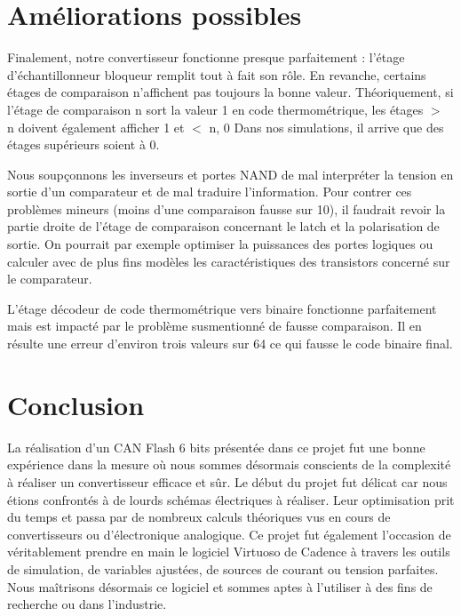 \documentclass[11pt]{article}
\begin{document}
\clearpage

\section{Am\'eliorations possibles}

Finalement, notre convertisseur fonctionne presque parfaitement : l'\'etage d'\'echantillonneur bloqueur remplit tout \`a fait son r\^ole.
En revanche, certains \'etages de comparaison n'affichent pas toujours la bonne valeur. Th\'eoriquement, si l'\'etage de comparaison n sort
la valeur 1 en code thermom\'etrique, les \'etages $>$ n doivent \'egalement afficher 1 et $<$ n, 0 Dans nos simulations, il arrive que des \'etages
sup\'erieurs soient \`a 0.

Nous soup\c connons les inverseurs et portes NAND de mal interpr\'eter la tension en sortie d'un comparateur et de mal traduire l'information.
Pour contrer ces probl\`emes mineurs (moins d'une comparaison fausse sur 10), il faudrait revoir la partie droite de l'\'etage de comparaison
concernant le latch et la polarisation de sortie. On pourrait par exemple optimiser la puissances des portes logiques ou calculer avec de
plus fins mod\`eles les caract\'eristiques des transistors concern\'e sur le comparateur.

L'\'etage d\'ecodeur de code thermom\'etrique vers binaire fonctionne parfaitement mais est impact\'e par le probl\`eme susmentionn\'e de fausse comparaison.
Il en r\'esulte une erreur d'environ trois valeurs sur 64 ce qui fausse le code binaire final.

\section{Conclusion}

La r\'ealisation d'un CAN Flash 6 bits pr\'esent\'ee dans ce projet fut une bonne exp\'erience dans la mesure o\`u nous sommes d\'esormais conscients
de la complexit\'e \`a r\'ealiser un convertisseur efficace et s\^ur.
Le d\'ebut du projet fut d\'elicat car nous \'etions confront\'es \`a de lourds sch\'emas \'electriques \`a r\'ealiser. Leur optimisation prit du temps et
passa par de nombreux calculs th\'eoriques vus en cours de convertisseurs ou d'\'electronique analogique.
Ce projet fut \'egalement l'occasion de v\'eritablement prendre en main le logiciel Virtuoso de Cadence \`a travers les outils de simulation,
 de variables ajust\'ees, de sources de courant ou tension parfaites. Nous maîtrisons d\'esormais ce logiciel et sommes aptes \`a l'utiliser \`a
 des fins de recherche ou dans l'industrie.
\end{document}

